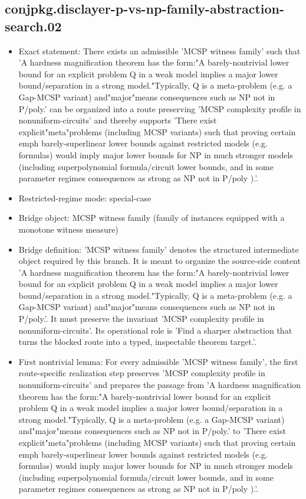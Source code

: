 \documentclass[11pt]{article}
\begin{document}
\subsection*{conjpkg.disclayer-p-vs-np-family-abstraction-search.02}
\begin{itemize}
\item Exact statement: There exists an admissible 'MCSP witness family' such that 'A hardness magnification theorem has the form:"A barely-nontrivial lower bound for an explicit problem Q in a weak model implies a major lower bound/separation in a strong model."Typically, Q is a meta-problem (e.g. a Gap-MCSP variant) and"major"means consequences such as NP not in P/poly.' can be organized into a route preserving 'MCSP complexity profile in nonuniform-circuits' and thereby supports 'There exist explicit"meta"problems (including MCSP variants) such that proving certain emph barely-superlinear lower bounds against restricted models (e.g. formulas) would imply major lower bounds for NP in much stronger models (including superpolynomial formula/circuit lower bounds, and in some parameter regimes consequences as strong as NP not in P/poly ).'.
\item Restricted-regime mode: special-case
\item Bridge object: MCSP witness family (family of instances equipped with a monotone witness measure)
\item Bridge definition: 'MCSP witness family' denotes the structured intermediate object required by this branch. It is meant to organize the source-side content 'A hardness magnification theorem has the form:"A barely-nontrivial lower bound for an explicit problem Q in a weak model implies a major lower bound/separation in a strong model."Typically, Q is a meta-problem (e.g. a Gap-MCSP variant) and"major"means consequences such as NP not in P/poly.'. It must preserve the invariant 'MCSP complexity profile in nonuniform-circuits'. Its operational role is 'Find a sharper abstraction that turns the blocked route into a typed, inspectable theorem target.'.
\item First nontrivial lemma: For every admissible 'MCSP witness family', the first route-specific realization step preserves 'MCSP complexity profile in nonuniform-circuits' and prepares the passage from 'A hardness magnification theorem has the form:"A barely-nontrivial lower bound for an explicit problem Q in a weak model implies a major lower bound/separation in a strong model."Typically, Q is a meta-problem (e.g. a Gap-MCSP variant) and"major"means consequences such as NP not in P/poly.' to 'There exist explicit"meta"problems (including MCSP variants) such that proving certain emph barely-superlinear lower bounds against restricted models (e.g. formulas) would imply major lower bounds for NP in much stronger models (including superpolynomial formula/circuit lower bounds, and in some parameter regimes consequences as strong as NP not in P/poly ).'.

\end{itemize}
\end{document}
